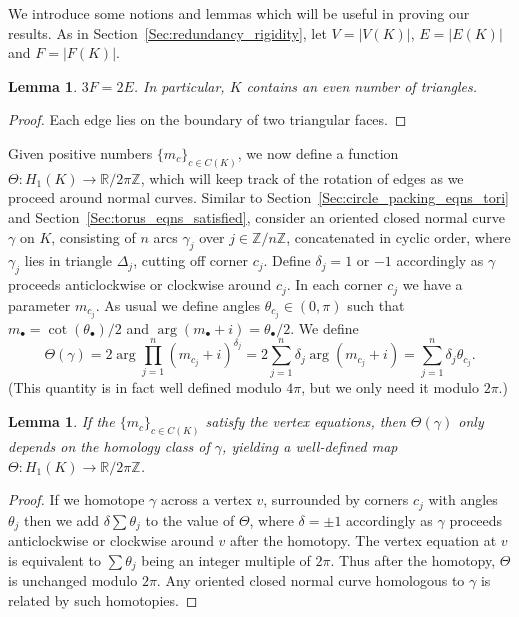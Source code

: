 \documentclass[12pt]{amsart}
\numberwithin{equation}{section}
\newtheorem{lem}[equation]{Lemma}
\theoremstyle{named}
\newcommand{\refsec}[1]{Section~\ref{Sec:#1}}
\newcommand{\R}{\mathbb{R}}
\newcommand{\Z}{\mathbb{Z}}
\newcommand{\To}{\longrightarrow}
\begin{document}
We introduce some notions and lemmas which will be useful in proving our results. As in \refsec{redundancy_rigidity}, let $V=|V(K)|$, $E=|E(K)|$ and $F=|F(K)|$.

\begin{lem}
\label{Lem:triangles_even}
$3F=2E$. In particular, $K$ contains an even number of triangles.
\end{lem}

\begin{proof}
Each edge lies on the boundary of two triangular faces.
\end{proof}

Given positive numbers $\{m_c\}_{c \in C(K)}$, we now define a function $\Theta \colon H_1 (K) \To \R/2\pi\Z$, which will keep track of the rotation of edges as we proceed around normal curves. Similar to \refsec{circle_packing_eqns_tori} and \refsec{torus_eqns_satisfied}, consider an oriented closed normal curve $\gamma$ on $K$, consisting of $n$ arcs $\gamma_j$ over $j \in \Z / n \Z$, concatenated in cyclic order, where $\gamma_j$ lies in triangle $\Delta_j$, cutting off corner $c_j$. Define $\delta_j = 1$ or $-1$ accordingly as $\gamma$ proceeds anticlockwise or clockwise around $c_j$. In each corner $c_j$ we have a parameter $m_{c_j}$. As usual we define angles $\theta_{c_j} \in (0,\pi)$ such that $m_\bullet = \cot(\theta_\bullet)/2$ and $\arg(m_\bullet + i) = \theta_\bullet/2$. We define
\begin{equation}
\label{Eqn:Theta_defn}
\Theta(\gamma) = 2 \arg \prod_{j=1}^{n} \left( m_{c_j} + i \right)^{\delta_j}
= 2 \sum_{j=1}^{n} \delta_j \arg \left( m_{c_j} + i \right) = \sum_{j=1}^{n} \delta_j \theta_{c_j}.
\end{equation}
(This quantity is in fact well defined modulo $4\pi$, but we only need it modulo $2\pi$.) 

\begin{lem}
\label{Lem:Theta_well_defined}
If the $\{m_c\}_{c \in C(K)}$ satisfy the vertex equations, then $\Theta(\gamma)$ only depends on the homology class of $\gamma$, yielding a well-defined map $\Theta \colon H_1 (K) \To \R/2\pi \Z$.
\end{lem}

\begin{proof}
If we homotope $\gamma$ across a vertex $v$, surrounded by corners $c_j$ with angles $\theta_j$ then we add $\delta \sum \theta_j$ to the value of $\Theta$, where $\delta = \pm 1$ accordingly as $\gamma$ proceeds anticlockwise or clockwise around $v$ after the homotopy. The vertex equation at $v$ is equivalent to $\sum \theta_j$ being an integer multiple of $2\pi$. Thus after the homotopy, $\Theta$ is unchanged modulo $2\pi$. Any oriented closed normal curve homologous to $\gamma$ is related by such homotopies.
\end{proof}
\end{document}
